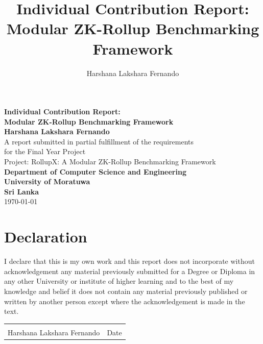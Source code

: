 \documentclass[12pt, a4paper]{uomthesis}
\title{Individual Contribution Report: Modular ZK-Rollup Benchmarking Framework}
\author{Harshana Lakshara Fernando}
\begin{document}
\begin{titlepage}
\begin{center}
    \vspace*{2cm}
    \Huge \textbf{Individual Contribution Report: \\ Modular ZK-Rollup Benchmarking Framework} \\
    \vspace{1.5cm}
    \Large \textbf{Harshana Lakshara Fernando} \\
    \vspace{2cm}
    \large A report submitted in partial fulfillment of the requirements \\
    for the Final Year Project \\
    \vspace{1.5cm}
    \normalsize Project: RollupX: A Modular ZK-Rollup Benchmarking Framework \\
    \vspace{2cm}
    \textbf{Department of Computer Science and Engineering} \\
    \textbf{University of Moratuwa} \\
    \textbf{Sri Lanka} \\
    \vfill
    \today
\end{center}
\end{titlepage}

\chapter*{Declaration}
I declare that this is my own work and this report does not incorporate without acknowledgement any material previously submitted for a Degree or Diploma in any other University or institute of higher learning and to the best of my knowledge and belief it does not contain any material previously published or written by another person except where the acknowledgement is made in the text.

\vspace{2cm}
\noindent
\begin{tabular}{@{}p{}p{}@{}}
    \dotfill & \dotfill \\
    Harshana Lakshara Fernando & Date \\
\end{tabular}
\end{document}
